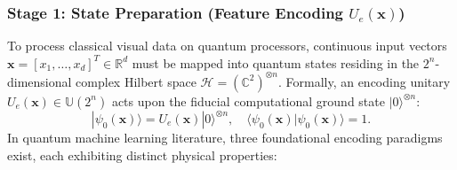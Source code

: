 \documentclass[journal]{IEEEtran}
\begin{document}
\subsubsection{Stage 1: State Preparation (Feature Encoding $U_e(\mathbf{x})$)}
To process classical visual data on quantum processors, continuous input vectors $\mathbf{x} = [x_1, \dots, x_d]^T \in \mathbb{R}^d$ must be mapped into quantum states residing in the $2^n$-dimensional complex Hilbert space $\mathcal{H} = (\mathbb{C}^2)^{\otimes n}$. Formally, an encoding unitary $U_e(\mathbf{x}) \in \mathbb{U}(2^n)$ acts upon the fiducial computational ground state $|0\rangle^{\otimes n}$:
\begin{equation}
|\psi_0(\mathbf{x})\rangle = U_e(\mathbf{x}) |0\rangle^{\otimes n}, \quad \langle \psi_0(\mathbf{x}) | \psi_0(\mathbf{x}) \rangle = 1.
\label{eq:state_prep_general}
\end{equation}
In quantum machine learning literature, three foundational encoding paradigms exist, each exhibiting distinct physical properties:
\end{document}

